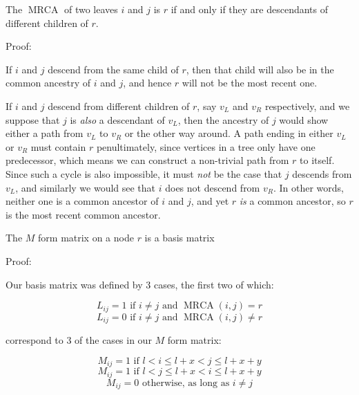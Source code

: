 \documentclass[10pt,a4paper]{report}
\DeclareMathOperator{\MRCA}{MRCA}
\begin{document}
\begin{lemma} The $\MRCA$ of two leaves $i$ and $j$ is $r$ if and only if they are descendants of different children of $r$.
\end{lemma}

Proof:

If $i$ and $j$ descend from the same child of $r$, then that child will also be in the common ancestry of $i$ and $j$, and hence $r$ will not be the most recent one.

If $i$ and $j$ descend from different children of $r$, say $v_L$ and $v_R$ respectively, and we suppose that $j$ is \emph{also} a descendant of $v_L$, then the ancestry of $j$ would show either a path from $v_L$ to $v_R$ or the other way around.
A path ending in either $v_L$ or $v_R$ must contain $r$ penultimately, since vertices in a tree only have one predecessor, which means we can construct a non-trivial path from $r$ to itself.
Since such a cycle is also impossible, it must \emph{not} be the case that $j$ descends from $v_L$, and similarly we would see that $i$ does not descend from $v_R$.
In other words, neither one is a common ancestor of $i$ and $j$, and yet $r$ \emph{is} a common ancestor, so $r$ is the most recent common ancestor.

\begin{lemma} The $M$ form matrix on a node $r$ is a basis matrix
\end{lemma}

Proof:

Our basis matrix was defined by 3 cases, the first two of which:

\begin{equation} \label{L_eqn_yes}
	L_{ij} = 1 \textrm{ if } i \neq j \textrm{ and } \MRCA(i, j) = r
\end{equation}
\begin{equation} \label{L_eqn_no}
	L_{ij} = 0 \textrm{ if } i \neq j \textrm{ and } \MRCA(i, j) \neq r
\end{equation}

correspond to 3 of the cases in our $M$ form matrix:

\begin{equation} \label{M_eqn_lr}
	M_{ij} = 1 \textrm{ if } l < i \leq l + x < j \leq l + x + y
\end{equation}
\begin{equation} \label{M_eqn_rl}
	M_{ij} = 1 \textrm{ if } l < j \leq l + x < i \leq l + x + y
\end{equation}
\begin{equation} \label{M_eqn_no}
	M_{ij} = 0 \textrm{ otherwise, as long as } i \neq j
\end{equation}
\end{document}
